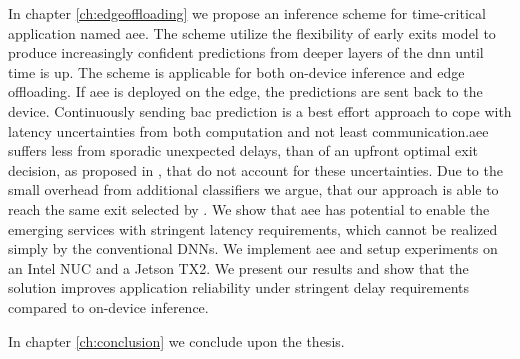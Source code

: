 In chapter \ref{ch:edgeoffloading} we propose an inference scheme for time-critical application named \acrfull{aee}. The scheme utilize the flexibility of early exits model to produce increasingly confident predictions from deeper layers of the \gls{dnn} until time is up. The scheme is applicable for both on-device inference and edge offloading.  If \gls{aee} is deployed on the edge, the predictions are sent back to the device. Continuously sending bac prediction is a best effort approach to cope with latency uncertainties from both computation and not least communication.\gls{aee} suffers less from sporadic unexpected delays, than of an upfront optimal exit decision, as proposed in \cite{li_edge_2018}, that do not account for these uncertainties. Due to the small overhead from additional classifiers we argue, that our approach is able to reach the same exit selected by \cite{li_edge_2018}. We show that \gls{aee} has potential to enable the emerging services with stringent latency requirements, which cannot be realized simply by the conventional DNNs. We implement \gls{aee} and setup experiments on an Intel NUC and a Jetson TX2. We present our results and show that the solution improves application reliability under stringent delay requirements compared to on-device inference.

In chapter \ref{ch:conclusion} we conclude upon the thesis.